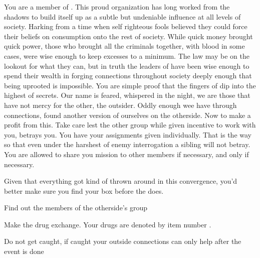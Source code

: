 \documentclass[blue]{guildcamp3}
\begin{document}
\name{\bMagicMob{}}


You are a member of \bMagicMob{}. This proud organization has long worked from the shadows to build itself up as a subtle but undeniable influence at all levels of \bMagicWorld{} society. Harking from a time when self righteous fools believed they could force their beliefs on consumption onto the rest of society. While quick money brought quick power, those who brought all the criminals together, with blood in some cases, were wise enough to keep excesses to a minimum. The law may be on the lookout for what they can, but in truth the leaders of \bMagicMob{} have been wise enough to spend their wealth in forging connections throughout society deeply enough that being uprooted is impossible. You are simple proof that the fingers of \bMagicMob{} dip into the highest of secrets. Our name is feared, whispered in the night, we are those that have not mercy for the other, the outsider. Oddly enough wee have through connections, found another version of ourselves on the otherside. Now to make a profit from this. Take care lest the other group while given incentive to work with you, betrays you. You have your assignments given individually. That is the way so that even under the harshest of enemy interrogation a sibling will not betray. You are allowed to share you mission to other members if necessary, and only if necessary.

Given that everything got kind of thrown around in this convergence, you'd better make sure you find your box before the \bTechMob{} does. 

\begin{itemz}[Goals]
	\item Find out the members of the otherside's group
	\item Make the drug exchange. Your drugs are denoted by item number \iDrugsMagic{}.
	\item Do not get caught, if caught your outside connections can only help after the event is done
\end{itemz}

\begin{members}
	\member{\cNobleTwo{\intro}} 
	\member{\cServant{\intro}} 
		
	\end{members}
\end{document}
